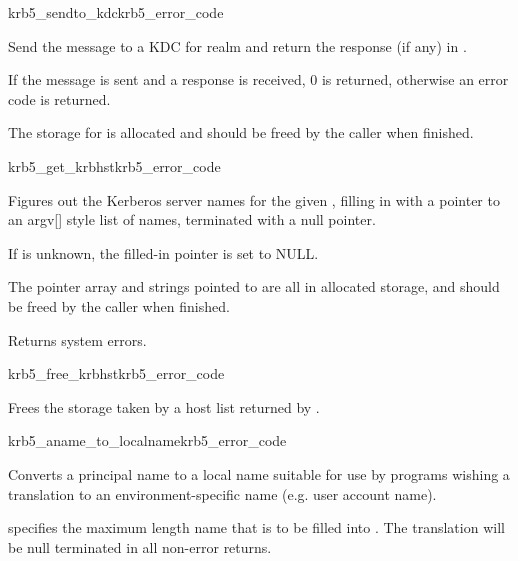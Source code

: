 \begin{funcdecl}{krb5_sendto_kdc}{krb5_error_code}{\funcin}
\funcout
{}
\end{funcdecl}

Send the message  to a KDC for realm  and
return the response (if any) in .

If the message is sent and a response is received, 0 is returned,
otherwise an error code is returned.

The storage for  is allocated and should be freed by
the caller when finished.

\begin{funcdecl}{krb5_get_krbhst}{krb5_error_code}{\funcin}
\funcout
{}
\end{funcdecl}

Figures out the Kerberos server names for the given ,
filling in
 with a
pointer to an argv[] style list of names, terminated with a null
pointer.
 
If  is unknown, the filled-in pointer is set to NULL.

The pointer array and strings pointed to are all in allocated storage,
and should be freed by the caller when finished.

Returns system errors.

\begin{funcdecl}{krb5_free_krbhst}{krb5_error_code}{\funcin}
\end{funcdecl}

Frees the storage taken by a host list returned by .

\begin{funcdecl}{krb5_aname_to_localname}{krb5_error_code}{\funcin}
\funcout
{}
\end{funcdecl}

Converts a principal name  to a local name suitable for use by
programs wishing a translation to an environment-specific name (e.g.
user account name).

 specifies the maximum length name that is to be filled into
.
The translation will be null terminated in all non-error returns.

